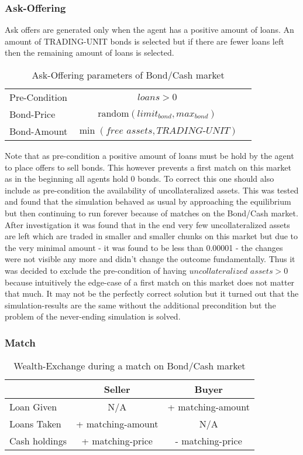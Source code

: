 \documentclass[Bachelorarbeit.tex]{subfiles}
\begin{document}
\subsubsection{Ask-Offering}
Ask offers are generated only when the agent has a positive amount of loans. An amount of TRADING-UNIT bonds is selected but if there are fewer loans left then the remaining amount of loans is selected.

\begin{table}[H]
	\centering
	\caption{Ask-Offering parameters of Bond/Cash market}
	\begin{tabular} { l c r }
		\hline
		Pre-Condition & $\textit{loans} > 0$  \\
		Bond-Price & $\mathrm{random}(limit_{bond}, max_{bond})$ \\
		Bond-Amount & $\min ({\textit{free assets} }, \textit{TRADING-UNIT} )$ \\
		\hline
	\end{tabular}
\end{table}

Note that as pre-condition a positive amount of loans must be hold by the agent to place offers to sell bonds. This however prevents a first match on this market as in the beginning all agents hold 0 bonds. To correct this one should also include as pre-condition the availability of uncollateralized assets. This was tested and found that the simulation behaved as usual by approaching the equilibrium but then continuing to run forever because of matches on the Bond/Cash market. After investigation it was found that in the end very few uncollateralized assets are left which are traded in smaller and smaller chunks on this market but due to the very minimal amount - it was found to be less than 0.00001 - the changes were not visible any more and didn't change the outcome fundamentally. Thus it was decided to exclude the pre-condition of having $\textit{uncollateralized assets} > 0$ because intuitively the edge-case of a first match on this market does not matter that much. It may not be the perfectly correct solution but it turned out that the simulation-results are the same without the additional precondition but the problem of the never-ending simulation is solved.

\subsubsection{Match}

\begin{table}[H]
	\centering
	\caption{Wealth-Exchange during a match on Bond/Cash market}
	\begin{tabular} { l c c }
		& Seller & Buyer \\
		\hline
		Loan Given & N/A & + matching-amount \\
		Loans Taken & + matching-amount & N/A \\
		Cash holdings & + matching-price & - matching-price \\
		\hline
	\end{tabular}
\end{table}
\end{document}
